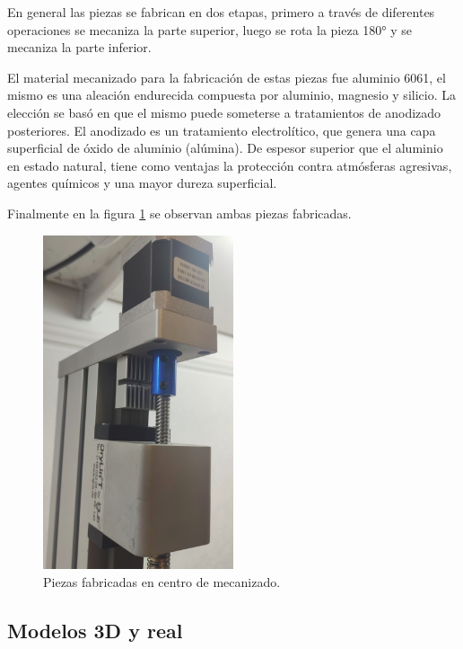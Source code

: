 En general las piezas se fabrican en dos etapas, primero a través de diferentes operaciones se mecaniza la parte superior, luego se rota la pieza 180° y se mecaniza la parte inferior.


El material mecanizado para la fabricación de estas piezas fue aluminio 6061, el mismo es una aleación endurecida compuesta por aluminio, magnesio y silicio. La elección se basó en que el mismo puede someterse a tratamientos de anodizado posteriores. El anodizado es un tratamiento electrolítico, que genera una capa superficial de óxido de aluminio (alúmina). De espesor superior que el aluminio en estado natural, tiene como ventajas la protección contra atmósferas agresivas, agentes químicos y una mayor dureza superficial.

Finalmente en la figura \ref{fig:real_custom} se observan ambas piezas fabricadas.

\begin{figure}[h]
	\centering
	\includegraphics[width=0.5\textwidth]{./Figures/real_custom.png}
	\caption{Piezas fabricadas en centro de mecanizado.}
	\label{fig:real_custom}
\end{figure}


\subsection{Modelos 3D y real}

